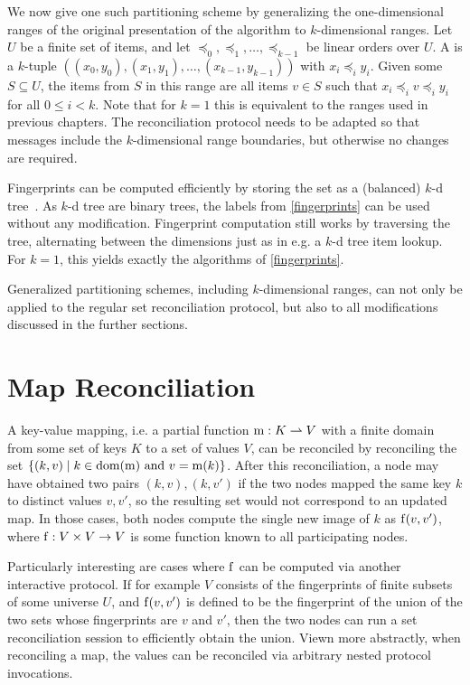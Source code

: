 We now give one such partitioning scheme by generalizing the one-dimensional ranges of the original presentation of the algorithm to $k$-dimensional ranges. Let $U$ be a finite set of items, and let $\preceq_0, \preceq_1, \ldots, \preceq_{k-1}$ be linear orders over $U$. A  is a $k$-tuple $((x_0, y_0), (x_1, y_1), \ldots, (x_{k-1}, y_{k-1}))$ with $x_i \preceq_i y_i$. Given some $S \subseteq U$, the items from $S$ in this range are all items $v \in S$ such that $x_i \preceq_i v \preceq_i y_i$ for all $0 \leq i < k$. Note that for $k = 1$ this is equivalent to the ranges used in previous chapters. The reconciliation protocol needs to be adapted so that messages include the $k$-dimensional range boundaries, but otherwise no changes are required.

Fingerprints can be computed efficiently by storing the set as a (balanced) $k$-d tree~\cite{bentley1975multidimensional}. As $k$-d tree are binary trees, the labels from \cref{fingerprints} can be used without any modification. Fingerprint computation still works by traversing the tree, alternating between the dimensions just as in e.g. a $k$-d tree item lookup. For $k = 1$, this yields exactly the algorithms of \cref{fingerprints}.

Generalized partitioning schemes, including $k$-dimensional ranges, can not only be applied to the regular set reconciliation protocol, but also to all modifications discussed in the further sections.

\section{Map Reconciliation}
\label{maps}

A key-value mapping, i.e. a partial function ${\operatorname{m}}: {K} \rightharpoonup{V}$ with a finite domain from some set of keys $K$ to a set of values $V$, can be reconciled by reconciling the set $\{(k, v) \mid \text{$k \in \operatorname{dom}(\operatorname{m})$ and $v = \operatorname{m}(k)$}\}$. After this reconciliation, a node may have obtained two pairs $(k, v), (k, v')$ if the two nodes mapped the same key $k$ to distinct values $v, v'$, so the resulting set would not correspond to an updated map. In those cases, both nodes compute the single new image of $k$ as $\operatorname{f}(v, v')$, where ${\operatorname{f}}: {V \times V} \rightarrow {V}$ is some function known to all participating nodes.

Particularly interesting are cases where $\operatorname{f}$ can be computed via another interactive protocol. If for example $V$ consists of the fingerprints of finite subsets of some universe $U$, and $\operatorname{f}(v, v')$ is defined to be the fingerprint of the union of the two sets whose fingerprints are $v$ and $v'$, then the two nodes can run a set reconciliation session to efficiently obtain the union. Viewn more abstractly, when reconciling a map, the values can be reconciled via arbitrary nested protocol invocations.

